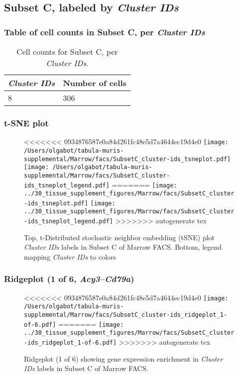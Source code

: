\clearpage

\subsection{Subset C, labeled by \emph{Cluster IDs}}
\subsubsection{Table of cell counts in Subset C, per \emph{Cluster IDs}}\begin{table}[h]
\centering
\label{my-label}
\begin{tabular}{@{}ll@{}}
\toprule

\emph{Cluster IDs}& Number of cells \\ \midrule
8 & 306 \\
\bottomrule
\end{tabular}
\caption{Cell counts for Subset C, per \emph{Cluster IDs}.}
\end{table}

\clearpage
\subsubsection{t-SNE plot}
\begin{figure}[h]
\centering
<<<<<<< 0934876587e0a84d261fc48e5d7a4644ec19d4e0
\texttt{[image: /Users/olgabot/tabula-muris-supplemental/Marrow/facs/SubsetC\_cluster-ids\_tsneplot.pdf]}
\texttt{[image: /Users/olgabot/tabula-muris-supplemental/Marrow/facs/SubsetC\_cluster-ids\_tsneplot\_legend.pdf]}
=======
\texttt{[image: ../30\_tissue\_supplement\_figures/Marrow/facs/SubsetC\_cluster-ids\_tsneplot.pdf]}
\texttt{[image: ../30\_tissue\_supplement\_figures/Marrow/facs/SubsetC\_cluster-ids\_tsneplot\_legend.pdf]}
>>>>>>> autogenerate tex
\caption{Top, t-Distributed stochastic neighbor embedding (tSNE) plot  \emph{Cluster IDs} labels in Subset C of Marrow FACS. Bottom, legend mapping \emph{Cluster IDs} to colors}
\end{figure}


\clearpage

\subsubsection{Ridgeplot (1 of 6, \emph{Acy3}--\emph{Cd79a})}
\begin{figure}[h]
\centering
<<<<<<< 0934876587e0a84d261fc48e5d7a4644ec19d4e0
\texttt{[image: /Users/olgabot/tabula-muris-supplemental/Marrow/facs/SubsetC\_cluster-ids\_ridgeplot\_1-of-6.pdf]}
=======
\texttt{[image: ../30\_tissue\_supplement\_figures/Marrow/facs/SubsetC\_cluster-ids\_ridgeplot\_1-of-6.pdf]}
>>>>>>> autogenerate tex

\caption{ Ridgeplot (1 of 6)  showing gene expression enrichment in \emph{Cluster IDs} labels in Subset C of Marrow FACS. }
\end{figure}


